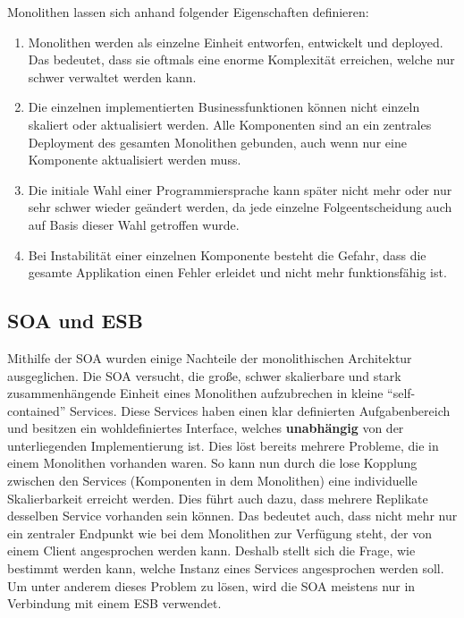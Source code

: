\begin{definition}[Monolith]
	Monolithen lassen sich anhand folgender Eigenschaften definieren: \autocite[S. 3]{microservice_enterprise}
	\begin{enumerate}
		\item Monolithen werden als einzelne Einheit entworfen, entwickelt und deployed. Das bedeutet, dass sie oftmals eine enorme Komplexität erreichen, welche nur schwer verwaltet werden kann.
		\item Die einzelnen implementierten Businessfunktionen können nicht einzeln skaliert oder aktualisiert werden. Alle Komponenten sind an ein zentrales Deployment des gesamten Monolithen gebunden, auch wenn nur eine Komponente aktualisiert werden muss.
		\item Die initiale Wahl einer Programmiersprache kann später nicht mehr oder nur sehr schwer wieder geändert werden, da jede einzelne Folgeentscheidung auch auf Basis dieser Wahl getroffen wurde.
		\item Bei Instabilität einer einzelnen Komponente besteht die Gefahr, dass die gesamte Applikation einen Fehler erleidet und nicht mehr funktionsfähig ist.
	\end{enumerate}
\end{definition}

\subsection{SOA und ESB}

Mithilfe der \ac{SOA} wurden einige Nachteile der monolithischen Architektur ausgeglichen. Die \ac{SOA} versucht, die große, schwer skalierbare und stark zusammenhängende Einheit eines Monolithen aufzubrechen in kleine \enquote{self-contained} Services. Diese Services haben einen klar definierten Aufgabenbereich und besitzen ein wohldefiniertes Interface, welches \textbf{unabhängig} von der unterliegenden Implementierung ist. Dies löst bereits mehrere Probleme, die in einem Monolithen vorhanden waren. So kann nun durch die lose Kopplung zwischen den Services (Komponenten in dem Monolithen) eine individuelle Skalierbarkeit erreicht werden. Dies führt auch dazu, dass mehrere Replikate desselben Service vorhanden sein können. Das bedeutet auch, dass nicht mehr nur ein zentraler Endpunkt wie bei dem Monolithen zur Verfügung steht, der von einem Client angesprochen werden kann. Deshalb stellt sich die Frage, wie bestimmt werden kann, welche Instanz eines Services angesprochen werden soll. Um unter anderem dieses Problem zu lösen, wird die \ac{SOA} meistens nur in Verbindung mit einem \ac{ESB} verwendet.

